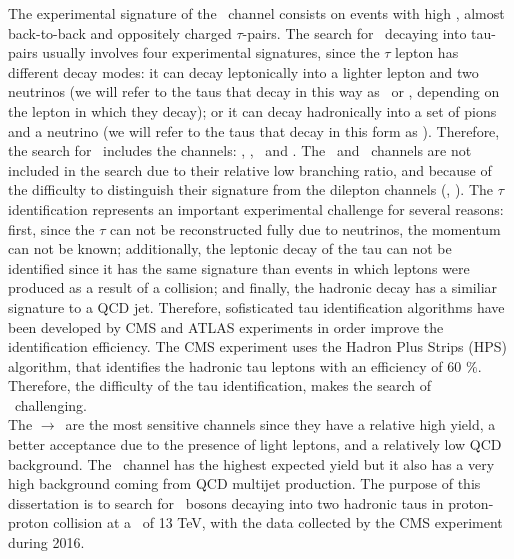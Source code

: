 The experimental signature of the \Zprimetotautau~channel consists on events with high \pt, almost
back-to-back and oppositely charged $\tau$-pairs. The search for \Zprime~decaying into tau-pairs 
usually involves four experimental signatures, since the $\tau$ lepton has different decay modes: it 
can decay leptonically into a lighter lepton and two neutrinos (we will refer to the taus that decay in 
this way as \taue~or \taumu, depending on the lepton in which they decay); 
or it can decay hadronically into a set of pions and a neutrino (we will refer to the taus that decay in this form
as \tauh). Therefore, the search for \Zprimetotautau~includes 
the channels: \taue\tauh, \taumu\tauh, \taue\taumu~and \tauh\tauh. The \taue\taue~and \taumu\taumu~channels
are not included in the search due to their relative low branching ratio, and because of the difficulty to
distinguish their signature from the dilepton channels (\Zprimetomumu, \Zprimetoee). The $\tau$ 
identification represents an important experimental challenge for several reasons: first, since 
the $\tau$ can not be reconstructed fully due to neutrinos, the momentum can not be known; additionally, the leptonic decay of 
the tau can not be identified since it has the same signature than events in which leptons were produced as a result of 
a collision; and finally, the hadronic decay has a similiar signature to a QCD jet. Therefore, sofisticated tau 
identification algorithms have been developed by CMS and ATLAS experiments in order improve the identification 
efficiency. The CMS experiment uses the Hadron Plus Strips (HPS) algorithm, that 
identifies the hadronic tau leptons with an efficiency of 60 $\%$. Therefore, the difficulty of the tau 
identification, makes the search of \Zprimetotautau~challenging. \\

The \Zprime$\rightarrow$\tauell\tauh~are the most sensitive channels since they have 
a relative high yield, a better acceptance due to the presence of light leptons, and a relatively
low QCD background. The \Zprimetotauh~channel has the highest 
expected yield but it also has a very high background coming 
from QCD multijet production. The purpose of this dissertation is to search for \Zprime~bosons decaying into two hadronic taus 
in proton-proton collision at a \centermassenergy~of 13 TeV, with the data collected by the 
CMS  experiment during 2016. \\


